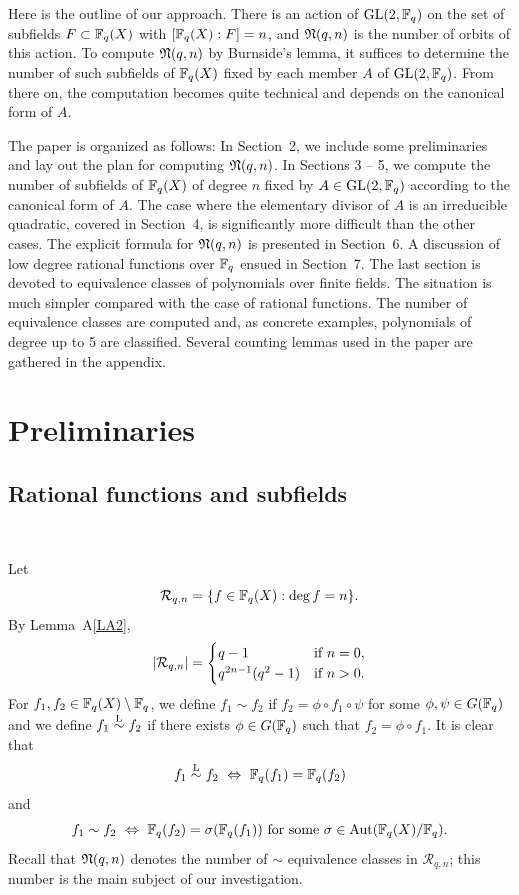 \documentclass{amsart}
\numberwithin{equation}{section}
\theoremstyle{definition}
\newcommand{\f}{\Bbb F}
\begin{document}
Here is the outline of our approach. There is an action of $\text{GL}(2,\f_q)$ on the set of subfields $F\subset\f_q(X)$ with $[\f_q(X):F]=n$, and $\frak N(q,n)$ is the number of orbits of this action. To compute $\frak N(q,n)$ by Burnside's lemma, it suffices to determine the number of such subfields of $\f_q(X)$ fixed by each member $A$ of $\text{GL}(2,\f_q)$. From there on, the computation becomes quite technical and depends on the canonical form of $A$.

The paper is organized as follows: In Section~2, we include some preliminaries and lay out the plan for computing $\frak N(q,n)$. In Sections 3 -- 5, we compute the number of subfields of $\f_q(X)$ of degree $n$ fixed by $A\in\text{GL}(2,\f_q)$ according to the canonical form of $A$. The case where the elementary divisor of $A$ is an irreducible quadratic, covered in Section~4, is significantly more difficult than the other cases. The explicit formula for $\frak N(q,n)$ is presented in Section~6. A discussion of low degree rational functions over $\f_q$ ensued in Section~7. The last section is devoted to equivalence classes of polynomials over finite fields. The situation is much simpler compared with the case of rational functions. The number of equivalence classes are computed and, as concrete examples, polynomials of degree up to 5 are classified. Several counting lemmas used in the paper are gathered in the appendix.


\section{Preliminaries}

\subsection{Rational functions and subfields}\

Let 
\begin{equation}\label{Rn}
\mathcal R_{q,n}=\{f\in\f_q(X):\deg f=n\}.
\end{equation}
By Lemma~A\ref{LA2},
\[
|\mathcal R_{q,n}|=\begin{cases}
q-1&\text{if}\ n=0,\cr
q^{2n-1}(q^2-1)&\text{if}\ n>0.
\end{cases}
\]
For $f_1,f_2\in\f_q(X)\setminus\f_q$, we define $f_1\sim f_2$ if $f_2=\phi\circ f_1\circ \psi$ for some $\phi,\psi\in G(\f_q)$ and we define $f_1\overset{\rm L}\sim f_2$ if there exists $\phi\in G(\f_q)$ such that $f_2=\phi\circ f_1$. It is clear that 
\[
f_1\overset{\rm L}\sim f_2 \ \Leftrightarrow\ \f_q(f_1)=\f_q(f_2)
\]
and
\[
f_1\sim f_2\ \Leftrightarrow\ \f_q(f_2)=\sigma(\f_q(f_1))\ \text{\rm for some}\ \sigma\in\text{Aut}(\f_q(X)/\f_q).
\]
Recall that $\frak N(q,n)$ denotes the number of $\sim$ equivalence classes in $\mathcal R_{q,n}$; this number is the main subject of our investigation.
\end{document}

